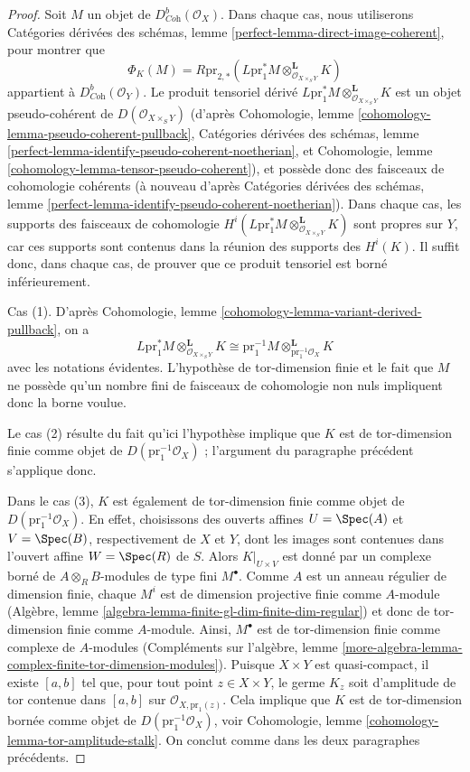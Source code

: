 \begin{proof}
Soit $M$ un objet de $D^b_{\textit{Coh}}(\mathcal{O}_X)$.
Dans chaque cas, nous utiliserons Catégories dérivées des schémas, lemme
\ref{perfect-lemma-direct-image-coherent}, pour montrer que
$$
\Phi_K(M) = R\text{pr}_{2, *}(
L\text{pr}_1^*M
\otimes_{\mathcal{O}_{X \times_S Y}}^\mathbf{L}
K)
$$
appartient à $D^b_{\textit{Coh}}(\mathcal{O}_Y)$. Le produit tensoriel dérivé
$L\text{pr}_1^*M \otimes_{\mathcal{O}_{X \times_S Y}}^\mathbf{L} K$
est un objet pseudo-cohérent de $D(\mathcal{O}_{X \times_S Y})$
(d'après
Cohomologie, lemme \ref{cohomology-lemma-pseudo-coherent-pullback},
Catégories dérivées des schémas, lemme
\ref{perfect-lemma-identify-pseudo-coherent-noetherian}, et
Cohomologie, lemme \ref{cohomology-lemma-tensor-pseudo-coherent}),
et possède donc des faisceaux de cohomologie cohérents (à nouveau d'après
Catégories dérivées des schémas, lemme
\ref{perfect-lemma-identify-pseudo-coherent-noetherian}).
Dans chaque cas, les supports des faisceaux de cohomologie
$H^i(L\text{pr}_1^*M \otimes_{\mathcal{O}_{X \times_S Y}}^\mathbf{L} K)$
sont propres sur $Y$, car ces supports sont contenus dans la
réunion des supports des $H^i(K)$. Il suffit donc, dans chaque cas,
de prouver que ce produit tensoriel est borné inférieurement.

\medskip\noindent
Cas (1). D'après Cohomologie, lemme \ref{cohomology-lemma-variant-derived-pullback},
on a
$$
L\text{pr}_1^*M
\otimes_{\mathcal{O}_{X \times_S Y}}^\mathbf{L}
K
\cong
\text{pr}_1^{-1}M
\otimes_{\text{pr}_1^{-1}\mathcal{O}_X}^\mathbf{L}
K
$$
avec les notations évidentes. L'hypothèse de tor-dimension finie
et le fait que $M$ ne possède qu'un nombre fini de
faisceaux de cohomologie non nuls impliquent donc la borne voulue.

\medskip\noindent
Le cas (2) résulte du fait qu'ici l'hypothèse implique que $K$ est de
tor-dimension finie comme objet de $D(\text{pr}_1^{-1}\mathcal{O}_X)$ ;
l'argument du paragraphe précédent s'applique donc.

\medskip\noindent
Dans le cas (3), $K$ est également de tor-dimension finie
comme objet de $D(\text{pr}_1^{-1}\mathcal{O}_X)$. En effet, choisissons
des ouverts affines $U = \Spec(A)$ et $V = \Spec(B)$, respectivement de $X$ et $Y$, dont les images sont contenues dans
l'ouvert affine $W = \Spec(R)$ de $S$. Alors
$K|_{U \times V}$ est donné par un complexe borné de
$A \otimes_R B$-modules de type fini $M^\bullet$. Comme $A$ est un anneau régulier
de dimension finie, chaque $M^i$ est de dimension projective finie
comme $A$-module (Algèbre, lemme
\ref{algebra-lemma-finite-gl-dim-finite-dim-regular})
et donc de tor-dimension finie comme $A$-module.
Ainsi, $M^\bullet$ est de tor-dimension finie comme complexe de $A$-modules
(Compléments sur l'algèbre, lemme
\ref{more-algebra-lemma-complex-finite-tor-dimension-modules}).
Puisque $X \times Y$ est quasi-compact, il existe $[a, b]$
tel que, pour tout point $z \in X \times Y$, le germe $K_z$
soit d'amplitude de tor contenue dans $[a, b]$ sur $\mathcal{O}_{X, \text{pr}_1(z)}$.
Cela implique que $K$ est de tor-dimension bornée comme objet de
$D(\text{pr}_1^{-1}\mathcal{O}_X)$, voir
Cohomologie, lemme \ref{cohomology-lemma-tor-amplitude-stalk}.
On conclut comme dans les deux paragraphes précédents.


\end{proof}

